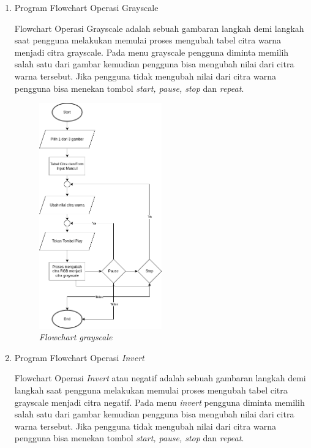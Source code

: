 \begin{enumerate}[leftmargin=1cm, itemindent=0.6cm,labelwidth=15pt, labelsep=5pt, listparindent=1cm,align=left]
    \item Program Flowchart Operasi Grayscale

        Flowchart Operasi Grayscale adalah sebuah gambaran langkah demi langkah saat pengguna melakukan memulai proses mengubah tabel citra warna menjadi citra grayscale. Pada menu grayscale pengguna diminta memilih salah satu dari gambar kemudian pengguna bisa mengubah nilai dari citra warna tersebut. Jika pengguna tidak mengubah nilai dari citra warna pengguna bisa menekan tombol \textit{start, pause, stop} dan \textit{repeat}.

          \begin{figure}[ht]
    	      \includegraphics[width=0.5\textwidth, center]{images/flowchart-grayscale.png}
              \caption{\textit{Flowchart grayscale}}
          \end{figure}

          \pagebreak

    \item Program Flowchart Operasi \textit{Invert}

        Flowchart Operasi \textit{Invert} atau negatif adalah sebuah gambaran langkah demi langkah saat pengguna melakukan memulai proses mengubah tabel citra grayscale menjadi citra negatif. Pada menu \textit{invert} pengguna diminta memilih salah satu dari gambar kemudian pengguna bisa mengubah nilai dari citra warna tersebut. Jika pengguna tidak mengubah nilai dari citra warna pengguna bisa menekan tombol \textit{start, pause, stop} dan \textit{repeat}.


\end{enumerate}
